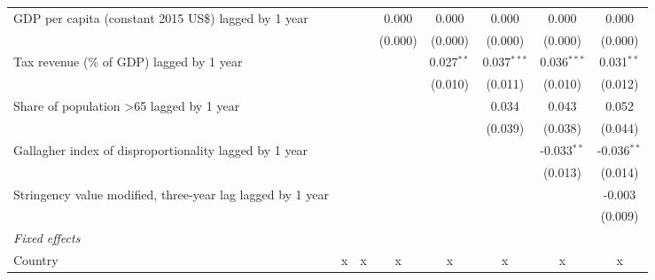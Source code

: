 \begin{tabular}{lccccccc}
   GDP per capita (constant 2015 US\$) lagged by 1 year                                   &              &              & 0.000        & 0.000         & 0.000         & 0.000         & 0.000\\   
                                                                                          &              &              & (0.000)      & (0.000)       & (0.000)       & (0.000)       & (0.000)\\   
   Tax revenue (\% of GDP) lagged by 1 year                                               &              &              &              & 0.027$^{**}$  & 0.037$^{***}$ & 0.036$^{***}$ & 0.031$^{**}$\\   
                                                                                          &              &              &              & (0.010)       & (0.011)       & (0.010)       & (0.012)\\   
   Share of population >65 lagged by 1 year                                               &              &              &              &               & 0.034         & 0.043         & 0.052\\   
                                                                                          &              &              &              &               & (0.039)       & (0.038)       & (0.044)\\   
   Gallagher index of disproportionality lagged by 1 year                                 &              &              &              &               &               & -0.033$^{**}$ & -0.036$^{**}$\\   
                                                                                          &              &              &              &               &               & (0.013)       & (0.014)\\   
   Stringency value modified, three-year lag lagged by 1 year                             &              &              &              &               &               &               & -0.003\\   
                                                                                          &              &              &              &               &               &               & (0.009)\\   
   \emph{Fixed effects}\\
   Country                                                                                & x            & x            & x            & x             & x             & x             & x\\  

\end{tabular}
